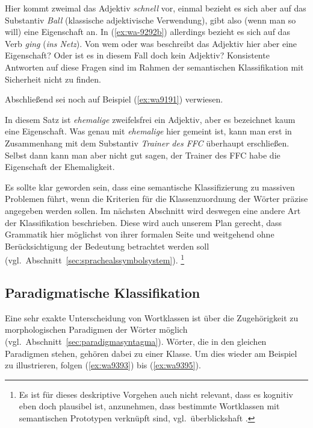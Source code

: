 
Hier kommt zweimal das Adjektiv \textit{schnell} vor, einmal bezieht es sich aber auf das Substantiv \textit{Ball} (klassische adjektivische Verwendung), gibt also (wenn man so will) eine Eigenschaft an.
In (\ref{ex:wa-9292b}) allerdings bezieht es sich auf das Verb \textit{ging} (\textit{ins Netz}).
Von wem oder was beschreibt das Adjektiv hier aber eine Eigenschaft?
Oder ist es in diesem Fall doch kein Adjektiv?
Konsistente Antworten auf diese Fragen sind im Rahmen der semantischen Klassifikation mit Sicherheit nicht zu finden.

Abschließend sei noch auf Beispiel (\ref{ex:wa9191}) verwiesen.

\begin{exe}
\end{exe}

In diesem Satz ist \textit{ehemalige} zweifelsfrei ein Adjektiv, aber es bezeichnet kaum eine Eigenschaft.
Was genau mit \textit{ehemalige} hier gemeint ist, kann man erst in Zusammenhang mit dem Substantiv \textit{Trainer des FFC} überhaupt erschließen.
Selbst dann kann man aber nicht gut sagen, der Trainer des FFC habe die Eigenschaft der Ehemaligkeit.

Es sollte klar geworden sein, dass eine semantische Klassifizierung zu massiven Problemen führt, wenn die Kriterien für die Klassenzuordnung der Wörter präzise angegeben werden sollen.
Im nächsten Abschnitt wird deswegen eine andere Art der Klassifikation beschrieben.
Diese wird auch unserem Plan gerecht, dass Grammatik hier möglichst von ihrer formalen Seite und weitgehend ohne Berücksichtigung der Bedeutung betrachtet werden soll (vgl.\ Abschnitt~\ref{sec:sprachealssymbolsystem}).%
\footnote{Es ist für dieses deskriptive Vorgehen auch nicht relevant, dass es kognitiv eben doch plausibel ist, anzunehmen, dass bestimmte Wortklassen mit semantischen Prototypen verknüpft sind, vgl.\ überblickshaft \citet{Croft2001}.}

\subsection{Paradigmatische Klassifikation}

\label{sec:paradigmatischeklassifikation}

Eine sehr exakte Unterscheidung von Wortklassen ist über die Zugehörigkeit zu morphologischen Paradigmen der Wörter möglich (vgl.\ Abschnitt~\ref{sec:paradigmasyntagma}).
Wörter, die in den gleichen Paradigmen stehen, gehören dabei zu einer Klasse.
Um dies wieder am Beispiel zu illustrieren, folgen (\ref{ex:wa9393}) bis (\ref{ex:wa9395}).

